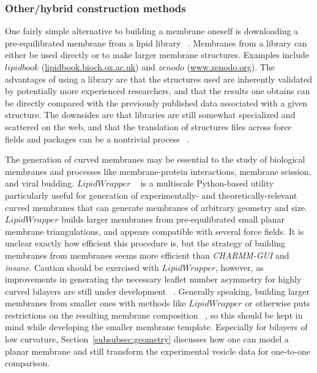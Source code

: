\documentclass[9pt,bestpractices,pubversion]{livecoms}
\begin{document}
\subsubsection{Other/hybrid construction methods}
\label{subsubsec:otherandhybridmtds}
One fairly simple alternative to building a membrane oneself is downloading a pre-equilibrated membrane from a lipid library ~\cite{Javanainen2016}.
Membranes from a library can either be used directly or to make larger membrane structures.
Examples include $lipidbook$ (\url{lipidbook.bioch.ox.ac.uk}) and $zenodo$ (\url{www.zenodo.org}).
The advantages of using a library are that the structures used are inherently validated by potentially more experienced researchers, and that the results one obtains can be directly compared with the previously published data associated with a given structure.
The downsides are that libraries are still somewhat specialized and scattered on the web, and that the translation of structures files across force fields and packages can be a nontrivial process ~\cite{Javanainen2016}.

The generation of curved membranes may be essential to the study of biological membranes and processes like membrane-protein interactions, membrane scission, and viral budding.
$LipidWrapper$ ~\cite{Durrant2014} is a multiscale Python-based utility particularly useful for generation of experimentally- and theoretically-relevant curved membranes that can generate membranes of arbitrary geometry and size.
$LipidWrapper$ builds larger membranes from pre-equilibrated small planar membrane triangulations, and appears compatible with several force fields.
It is unclear exactly how efficient this procedure is, but the strategy of building membranes from membranes seems more efficient than \textit{CHARMM-GUI} and \textit{insane}.
Caution should be exercised with $LipidWrapper$, however, as improvements in generating the necessary leaflet number asymmetry for highly curved bilayers are still under development ~\cite{Durrant2014}.
Generally speaking, building larger membranes from smaller ones with methods like $LipidWrapper$ or otherwise puts restrictions on the resulting membrane composition ~\cite{Wassenaar2015a}, so this should be kept in mind while developing the smaller membrane template.
Especially for bilayers of low curvature, Section~\ref{subsubsec:geometry} discusses how one can model a planar membrane and still transform the experimental vesicle data for one-to-one comparison.
\end{document}
